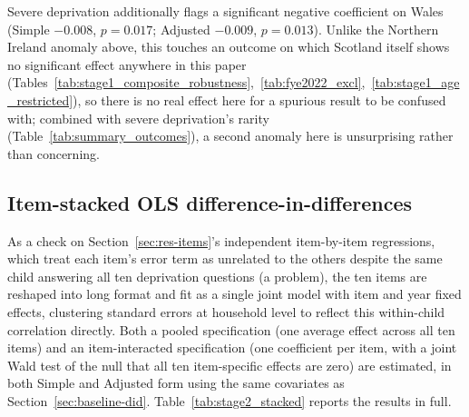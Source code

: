 Severe deprivation additionally flags a significant negative coefficient on Wales (Simple $-0.008$, $p=0.017$; Adjusted $-0.009$, $p=0.013$). Unlike the Northern Ireland anomaly above, this touches an outcome on which Scotland itself shows no significant effect anywhere in this paper (Tables~\ref{tab:stage1_composite_robustness},~\ref{tab:fye2022_excl},~\ref{tab:stage1_age_restricted}), so there is no real effect here for a spurious result to be confused with; combined with severe deprivation's rarity (Table~\ref{tab:summary_outcomes}), a second anomaly here is unsurprising rather than concerning.



\subsection{Item-stacked OLS difference-in-differences}
\label{sec:appendix-stacked}

As a check on Section~\ref{sec:res-items}'s independent item-by-item regressions, which treat each item's error term as unrelated to the others despite the same child answering all ten deprivation questions (a \citet{moulton1990} problem), the ten items are reshaped into long format and fit as a single joint model with item and year fixed effects, clustering standard errors at household level to reflect this within-child correlation directly. Both a pooled specification (one average effect across all ten items) and an item-interacted specification (one coefficient per item, with a joint Wald test of the null that all ten item-specific effects are zero) are estimated, in both Simple and Adjusted form using the same covariates as Section~\ref{sec:baseline-did}. Table~\ref{tab:stage2_stacked} reports the results in full.



